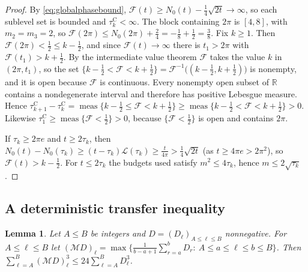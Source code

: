 \documentclass[11pt,a4paper]{article}
\makeatletter
\numberwithin{equation}{section}
\DeclareRobustCommand{\CGeqref}[1]{\eqref{#1}}
\let\CG@origeqref\eqref
\newcommand{\CG@gettip}[1]{\@ifundefined{CGTip@#1}{#1}{\csname CGTip@#1\endcsname}}
\DeclareRobustCommand{\CGeqref}[1]{\pdftooltip{\CG@origeqref{#1}}{\CG@gettip{#1}}}
\newtheorem{lemma}[theorem]{Lemma}
\theoremstyle{definition}
\theoremstyle{remark}
\newcommand{\Nz}{N_0} %
\newcommand{\lL}{\mathcal L}
\newcommand{\Fc}{\mathcal F}
\newcommand{\M}{\mathcal M}
\newcommand{\meas}{\operatorname{meas}}
\newcommand{\R}{\mathbb R}
\makeatother
\begin{document}
\begin{proof}
By \CGeqref{eq:globalphasebound}, $\Fc(t)\ge\Nz(t)-\frac14\sqrt{2t}\to\infty$, so each sublevel set is bounded and $\tau_{k}^{\mathrm C}<\infty$. The block containing $2\pi$ is $[4,8]$, with $m_2=m_3=2$, so $\Fc(2\pi)\le\Nz(2\pi)+\frac24=-\frac18+\frac12=\frac38$. Fix $k\ge1$. Then $\Fc(2\pi)<\frac12\le k-\frac12$, and since $\Fc(t)\to\infty$ there is $t_1>2\pi$ with $\Fc(t_1)>k+\frac12$. By the intermediate value theorem $\Fc$ takes the value $k$ in $(2\pi,t_1)$, so the set $\{k-\frac12<\Fc<k+\frac12\}=\Fc^{-1}\bigl((k-\frac12,k+\frac12)\bigr)$ is nonempty, and it is open because $\Fc$ is continuous. Every nonempty open subset of $\R$ contains a nondegenerate interval and therefore has positive Lebesgue measure. Hence $\tau_{k+1}^{\mathrm C}-\tau_{k}^{\mathrm C}=\meas\{k-\frac12\le\Fc<k+\frac12\}\ge\meas\{k-\frac12<\Fc<k+\frac12\}>0$. Likewise $\tau_{1}^{\mathrm C}\ge\meas\{\Fc<\frac12\}>0$, because $\{\Fc<\frac12\}$ is open and contains $2\pi$.

If $\tau_k\ge2\pi e$ and $t\ge2\tau_k$, then $\Nz(t)-\Nz(\tau_k)\ge(t-\tau_k)\lL(\tau_k)\ge\frac t{4\pi}>\frac14\sqrt{2t}$ (as $t\ge4\pi e>2\pi^2$), so $\Fc(t)>k-\frac12$. For $t\le2\tau_k$ the budgets used satisfy $m^2\le4\tau_k$, hence $m\le2\sqrt{\tau_k}$.
\end{proof}

\subsection{A deterministic transfer inequality}\label{subsec:transfer}

\begin{lemma}\label{lem:maximal}
Let $A\le B$ be integers and $D=(D_\ell)_{A\le\ell\le B}$ nonnegative. For $A\le\ell\le B$ let $(\M D)_\ell=\max\{\frac1{b-a+1}\sum_{r=a}^bD_r:\ A\le a\le\ell\le b\le B\}$. Then $\sum_{\ell=A}^B(\M D)_\ell^3\le24\sum_{\ell=A}^BD_\ell^3$.
\end{lemma}
\end{document}
